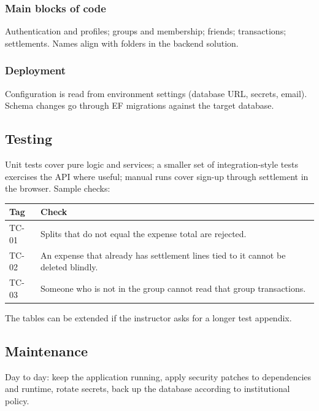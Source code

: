 \documentclass[11pt,a4paper]{article}
\begin{document}
\subsubsection{Main blocks of code}

Authentication and profiles; groups and membership; friends; transactions; settlements. Names align with folders in the backend solution.

\subsubsection{Deployment}

Configuration is read from environment settings (database URL, secrets, email). Schema changes go through EF migrations against the target database.

\subsection{Testing}

Unit tests cover pure logic and services; a smaller set of integration-style tests exercises the API where useful; manual runs cover sign-up through settlement in the browser. Sample checks:

\begin{center}
\begin{tabular}{@{}p{}p{}@{}}
\toprule
\textbf{Tag} & \textbf{Check} \\
\midrule
TC-01 & Splits that do not equal the expense total are rejected. \\
TC-02 & An expense that already has settlement lines tied to it cannot be deleted blindly. \\
TC-03 & Someone who is not in the group cannot read that group transactions. \\
\bottomrule
\end{tabular}
\end{center}

\noindent The tables can be extended if the instructor asks for a longer test appendix.

\subsection{Maintenance}

Day to day: keep the application running, apply security patches to dependencies and runtime, rotate secrets, back up the database according to institutional policy.
\end{document}
